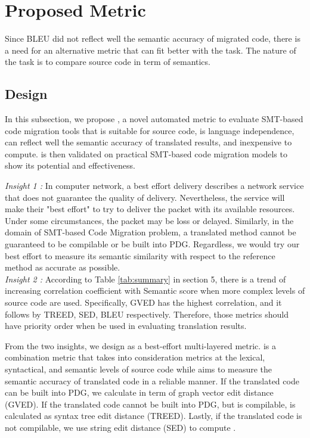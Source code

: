 \section{Proposed Metric}
Since BLEU did not reflect well the semantic accuracy of migrated code, there is a need for an alternative metric that can fit better with the task. The nature of the task is to compare source code in term of semantics. 

\subsection{Design}
In this subsection, we propose {\model}, a novel automated metric to evaluate SMT-based code migration tools that is suitable for source code, is language independence, can reflect well the semantic accuracy of translated results, and inexpensive to compute. {\model} is then validated on practical SMT-based code migration models to show its potential and effectiveness. 

\emph{Insight 1 :} In computer network, a best effort delivery describes a network service that does not guarantee the quality of delivery. Nevertheless, the service will make their "best effort" to try to deliver the packet with its available resources. Under some circumstances, the packet may be loss or delayed. Similarly, in the domain of SMT-based Code Migration problem, a translated method cannot be guaranteed to be compilable or be built into PDG. Regardless, we would try our best effort to measure its semantic similarity with respect to the reference method as accurate as possible. \\
\emph{Insight 2 :}
According to Table \ref{tab:summary} in section 5, there is a trend of increasing correlation coefficient with Semantic score when more complex levels of source code are used. Specifically, GVED has the highest correlation, and it follows by TREED, SED, BLEU respectively. Therefore, those metrics should have priority order when be used in evaluating translation results.  

From the two insights, we design {\model} as a best-effort multi-layered metric. {\model} is a combination metric that takes into consideration metrics at the lexical, syntactical, and semantic levels of source code while aims to measure the semantic accuracy of translated code in a reliable manner. If the translated code can be built into PDG, we calculate {\model} in term of graph vector edit distance (GVED). If the translated code cannot be built into PDG, but is compilable, {\model} is calculated as syntax tree edit distance (TREED). Lastly, if the translated code is not compilable, we use string edit distance (SED) to compute {\model}.

